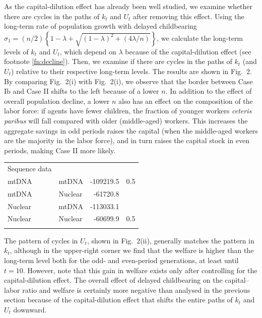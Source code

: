 \documentclass{MBE}%
\begin{document}
{\enlargethispage{2pt}

As the capital-dilution effect has already been well studied, we examine whether there are cycles
in the paths of $k_{t}$ and $U_{t}$ after removing this effect. {Using the \hbox{long-term} rate
of population growth with delayed childbearing $\sigma_{1}=(n/2)\left\{  1-\lambda+
\sqrt{(1-\lambda )^{2}+(4\lambda/n)}\right\}  $, we calculate the long-term levels of $k_{t}$ and
$U_{t}$, which depend on $\lambda$ because of the capital-dilution effect (see footnote
\ref{fn:decline}). Then, we examine if there are cycles in the paths of $k_{t}$ (and $U_{t}$)
relative to their respective long-term levels.} The results are shown in Fig.~2. By comparing
Fig.~2(i) with Fig.~2(i), we observe that the border between Case Ib and Case II shifts to the
left because of a lower $n$. In addition to the effect of overall population decline, a lower $n$
also has an effect on the composition of the labor force: if agents have fewer children, the
fraction of younger workers \textit{ceteris paribus} will fall compared with older (middle-aged)
workers. This increases the aggregate savings in odd periods raises the capital (when the
middle-aged workers are the majority in the labor force), and in turn raises the capital stock in
even periods, making Case II more likely.

\begin{table}[!t]%
{\begin{tabular*}{\columnwidth}{@{\extracolsep{\fill}}lld{6,0}d{6,0}@{}}\toprule Sequence data &
 &  &  \\\colrule mtDNA& mtDNA& -109219.5& 0.5 \\
[0.1pt]
mtDNA& Nuclear& -61720.8&  \\
Nuclear& mtDNA& -113033.1&  \\
Nuclear& Nuclear& -60699.9& 0.5 \\\botrule
\end{tabular*}}
{}
\end{table}

The pattern of cycles in $U_{t}$, shown in Fig.~2(ii), generally matches the pattern in $k_{t}$,
although in the upper-right corner we find that the welfare is higher than the long-term level
both for the odd- and even-period generations, at least until $t=10$. However, note that this gain
in welfare exists only after controlling for the capital-dilution effect. The overall effect of
delayed childbearing on the capital--labor ratio and welfare is certainly more negative than
analysed in the previous section because of the capital-dilution effect that shifts the entire
paths of $k_{t}$ and $U_{t}$ downward.

}
\end{document}
